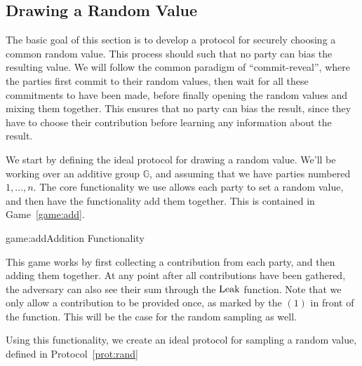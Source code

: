 \subsection{Drawing a Random Value}

The basic goal of this section is to develop a protocol for securely
choosing a common random value.
This process should such that no party can bias the resulting value.
We will follow the common paradigm of ``commit-reveal'', where the parties
first commit to their random values, then wait for all these commitments to have been made,
before finally opening the random values and mixing them together.
This ensures that no party can bias the result, since they have to choose
their contribution before learning any information about the result.

We start by defining the ideal protocol for drawing a random value.
We'll be working over an additive group $\mathbb{G}$,
and assuming that we have parties numbered $1, \ldots, n$.
The core functionality we use allows each party to set a random value,
and then have the functionality add them together.
This is contained in Game~\ref{game:add}.

\begin{game}{game:add}{Addition Functionality}
\end{game}

This game works by first collecting a contribution from each party,
and then adding them together.
At any point after all contributions have been gathered,
the adversary can also see their sum through the $\text{Leak}$ function.
Note that we only allow a contribution to be provided once,
as marked by the $(1)$ in front of the function.
This will be the case for the random sampling as well.

Using this functionality, we create an ideal protocol for sampling
a random value, defined in Protocol~\ref{prot:rand}

